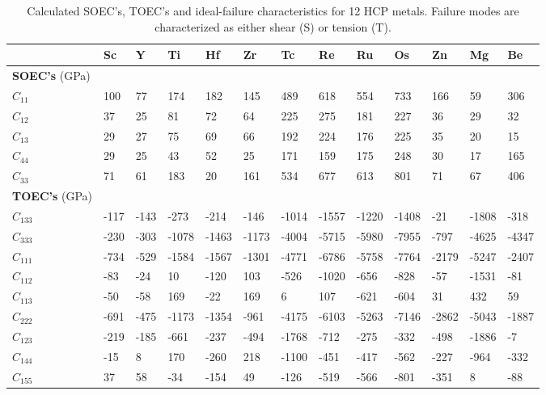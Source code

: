 \documentclass[showpacs,aps,floatfix,prb,reprint,superscriptaddress]{revtex4-1}
\begin{document}
\begin{table}
\caption{\label{tab:Re_properties_total} Calculated SOEC's, TOEC's and ideal-failure characteristics for 12 HCP metals. Failure modes are characterized as either shear (S) or tension (T).}
\begin{ruledtabular}
\begin{tabular}{l l l l l l l l l l l l l}
 & Sc & Y & Ti & Hf & Zr & Tc & Re & Ru & Os & Zn & Mg & Be \\
\hline
\textbf{SOEC's} (GPa) & & & & & & & & & & & & \\
$C_{11}$ & 100 & 77 & 174 & 182 & 145 & 489 & 618 & 554 & 733 & 166 & 59 & 306 \\
$C_{12}$ & 37 & 25 & 81 & 72    & 64  & 225 & 275 & 181 & 227 & 36  & 29 & 32 \\
$C_{13}$ & 29 & 27 & 75 & 69    & 66  & 192 & 224 & 176 & 225 & 35  & 20 & 15 \\
$C_{44}$ & 29 & 25 & 43 & 52    & 25  & 171 & 159 & 175 & 248 & 30  & 17 & 165 \\
$C_{33}$ & 71 & 61 & 183 & 20   & 161 & 534 & 677 & 613 & 801 & 71  & 67 & 406 \\
\hline
\textbf{TOEC's} (GPa) & & & & & & & & & & & & \\
$C_{133}$ & -117 & -143   & -273  & -214  & -146  & -1014 & -1557 & -1220 & -1408 &  -21 &  -1808 & -318 \\
$C_{333}$ & -230 & -303   & -1078 & -1463 & -1173 & -4004 & -5715 & -5980 & -7955 &  -797 &  -4625 & -4347 \\
$C_{111}$ & -734 & -529   & -1584 & -1567 & -1301 & -4771 & -6786 & -5758 & -7764 &  -2179 &  -5247 & -2407 \\
$C_{112}$ & -83 & -24     &  10   & -120  & 103   & -526  & -1020 & -656 & -828 &  -57 &  -1531 & -81 \\
$C_{113}$ & -50 & -58     & 169   & -22   & 169   & 6     & 107   & -621 & -604 &  31 &  432 & 59 \\
$C_{222}$ & -691 & -475   & -1173 & -1354 & -961  & -4175 & -6103 & -5263 & -7146 &  -2862 & -5043 & -1887 \\
$C_{123}$ & -219 & -185   & -661  & -237  & -494  & -1768 & -712  & -275 & -332 &  -498 &  -1886 & -7 \\
$C_{144}$ & -15 & 8       & 170   & -260  & 218   & -1100 & -451  & -417 & -562 &  -227 &  -964 & -332 \\
$C_{155}$ & 37 & 58       & -34   & -154  & 49    & -126  & -519  & -566 & -801 &  -351 & 8 & -88 \\

\end{tabular}
\end{ruledtabular}
\end{table}
\end{document}
